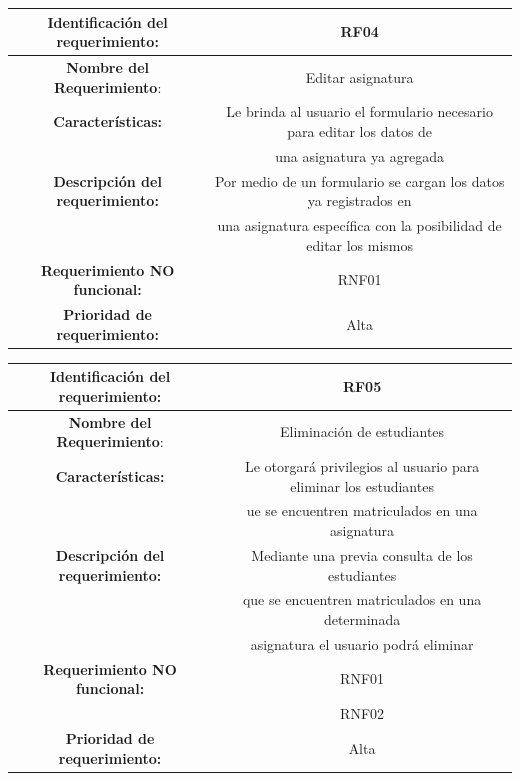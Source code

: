 \documentclass[11pt]{article}
\begin{document}
\begin{tabular}{|c|c|} 
\hline
\textbf{Identificación del requerimiento:} & RF04  \\
\hline
\textbf{Nombre del Requerimiento}: & Editar asignatura \\
\hline
\textbf{Características:} & Le brinda al usuario el formulario 
necesario para editar los datos de \\ &una asignatura ya agregada \\
\hline
\textbf{Descripción del requerimiento:} & Por medio de un formulario
se cargan los datos ya registrados en\\ & una asignatura específica
con la posibilidad de editar los mismos \\
\hline
\textbf{Requerimiento NO funcional:} & RNF01  \\
\hline
\textbf{Prioridad de requerimiento:} & Alta \\
\hline

\end{tabular}

\vspace{15pt}

\begin{tabular}{|c|c|} 
\hline
\textbf{Identificación del requerimiento:} & RF05  \\
\hline
\textbf{Nombre del Requerimiento}: & Eliminación de estudiantes \\
\hline
\textbf{Características:} & Le otorgará privilegios al usuario para
eliminar los estudiantes \\ & ue se encuentren matriculados en una 
asignatura \\
\hline
\textbf{Descripción del requerimiento:} & Mediante una previa 
consulta de los estudiantes\\ & que se encuentren matriculados en
una determinada \\ &  asignatura el usuario podrá eliminar \\
\hline
\textbf{Requerimiento NO funcional:} & RNF01 \\
& RNF02  \\
\hline
\textbf{Prioridad de requerimiento:} & Alta \\
\hline

\end{tabular}


\vspace{15pt}
\end{document}
